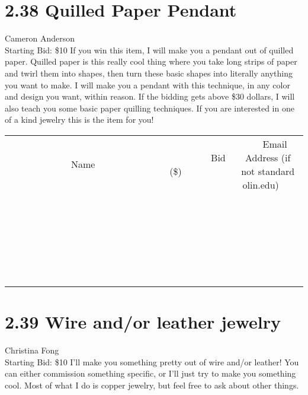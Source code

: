 \documentclass[11pt]{article}
\begin{document}
\section*{2.38 Quilled Paper Pendant}
Cameron Anderson
\\
Starting Bid: \$10
\newline
If you win this item, I will make you a pendant out of quilled paper. Quilled paper is this really cool thing where you take long strips of paper and twirl them into shapes, then turn these basic shapes into literally anything you want to make. I will make you a pendant with this technique, in any color and design you want, within reason. If the bidding gets above \$30 dollars, I will also teach you some basic paper quilling techniques. If you are interested in one of a kind jewelry this is the item for you!
\\[6ex]
\begin{tabular}{c c c}
~~~~~~~~~~~~~Name~~~~~~~~~~~~~ & ~~~~~~~~~Bid (\$)~~~~~~~~~  & ~~~Email Address (if not standard olin.edu)~~~\\
 & & \\
\hline
 & & \\
\hline
 & & \\
\hline
 & & \\
\hline
 & & \\
\hline
 & & \\
\hline
 & & \\
\hline
 & & \\
\hline
 & & \\
\hline
 & & \\
\hline
 & & \\
\hline
 & & \\
\hline
 & & \\
\hline
 & & \\
\hline
 & & \\
\hline
 & & \\
\hline
 & & \\
\hline
 & & \\
\hline
 & & \\
\hline
 & & \\
\hline
 & & \\
\hline
 & & \\
\hline
 & & \\
\hline
 & & \\
\hline
 & & \\
\hline
 & & \\
\hline
\end{tabular}
\newpage
\section*{2.39 Wire and/or leather jewelry}
Christina Fong
\\
Starting Bid: \$10
\newline
I'll make you something pretty out of wire and/or leather!  You can either commission something specific, or I'll just try to make you something cool.  Most of what I do is copper jewelry, but feel free to ask about other things. 
\end{document}
